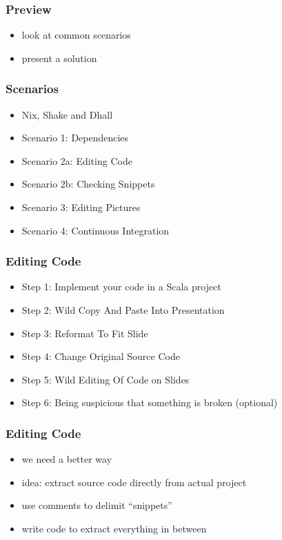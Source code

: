 \documentclass{beamer}
\begin{document}
\begin{frame}
  \frametitle{Preview}
  \begin{itemize}
  \item look at common scenarios
  \item present a solution
  \end{itemize}
\end{frame}

\begin{frame}
  \frametitle{Scenarios}
  \begin{itemize}
  \item Nix, Shake and Dhall
  \item Scenario 1: Dependencies
  \item Scenario 2a: Editing Code
  \item Scenario 2b: Checking Snippets
  \item Scenario 3: Editing Pictures
  \item Scenario 4: Continuous Integration
  \end{itemize}
\end{frame}

\begin{frame}
  \frametitle{Editing Code}
  \begin{itemize}
  \item Step 1: Implement your code in a Scala project
  \item Step 2: Wild Copy And Paste Into Presentation
  \item Step 3: Reformat To Fit Slide
  \item Step 4: Change Original Source Code
  \item Step 5: Wild Editing Of Code on Slides
  \item Step 6: Being suspicious that something is broken (optional)
  \end{itemize}
\end{frame}

\begin{frame}
  \frametitle{Editing Code}
  \begin{itemize}
  \item we need a better way
  \item idea: extract source code directly from actual project
  \item use comments to delimit ``snippets''
  \item write code to extract everything in between
  \end{itemize}
\end{frame}
\end{document}
